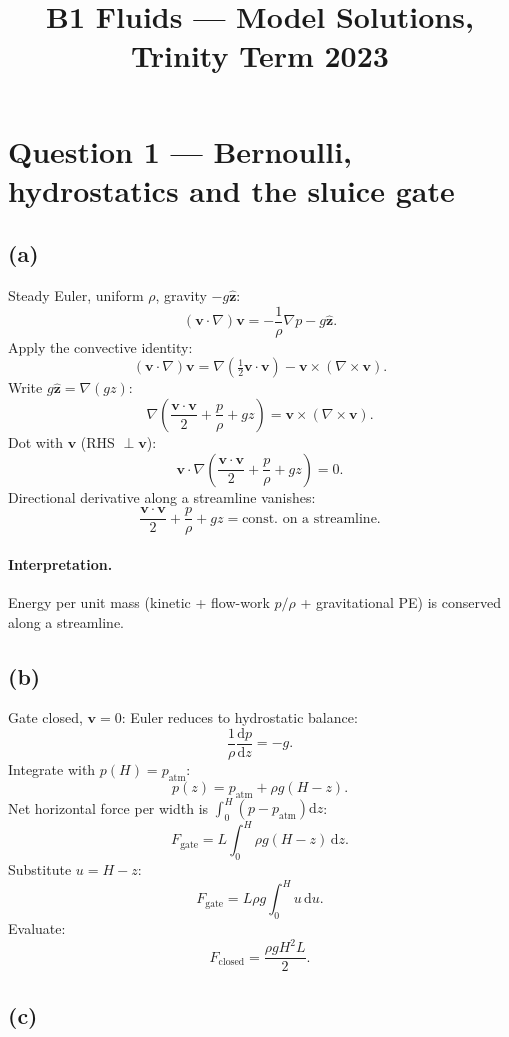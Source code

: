 \documentclass[11pt]{article}
\title{B1 Fluids --- Model Solutions, Trinity Term 2023}
\author{}
\date{}
\newcommand{\de}{\mathrm{d}}
\begin{document}
\maketitle

\section*{Question 1 --- Bernoulli, hydrostatics and the sluice gate}

\subsection*{(a)}

Steady Euler, uniform $\rho$, gravity $-g\hat{\bm z}$:
\[ (\bm v\cdot\nabla)\bm v = -\frac{1}{\rho}\nabla p - g\hat{\bm z}. \]
Apply the convective identity:
\[ (\bm v\cdot\nabla)\bm v = \nabla\!\left(\tfrac12 \bm v\cdot\bm v\right) - \bm v\times(\nabla\times\bm v). \]
Write $g\hat{\bm z} = \nabla(gz)$:
\[ \nabla\!\left(\frac{\bm v\cdot\bm v}{2} + \frac{p}{\rho} + gz\right) = \bm v\times(\nabla\times\bm v). \]
Dot with $\bm v$ (RHS $\perp\bm v$):
\[ \bm v\cdot\nabla\!\left(\frac{\bm v\cdot\bm v}{2} + \frac{p}{\rho} + gz\right) = 0. \]
Directional derivative along a streamline vanishes:
\[ \boxed{\;\frac{\bm v\cdot\bm v}{2} + \frac{p}{\rho} + gz = \text{const.\ on a streamline.}\;} \]

\paragraph{Interpretation.} Energy per unit mass (kinetic + flow-work $p/\rho$ + gravitational PE) is conserved along a streamline.

\subsection*{(b)}

Gate closed, $\bm v=0$: Euler reduces to hydrostatic balance:
\[ \frac{1}{\rho}\frac{\de p}{\de z} = -g. \]
Integrate with $p(H)=p_{\text{atm}}$:
\[ p(z) = p_{\text{atm}} + \rho g(H-z). \]
Net horizontal force per width is $\int_0^H (p-p_{\text{atm}})\de z$:
\[ F_{\text{gate}} = L\!\int_0^H \rho g(H-z)\,\de z. \]
Substitute $u = H-z$:
\[ F_{\text{gate}} = L\rho g\!\int_0^H u\,\de u. \]
Evaluate:
\[ \boxed{\;F_{\text{closed}} = \frac{\rho g H^{2}L}{2}.\;} \]

\subsection*{(c)}
\end{document}
